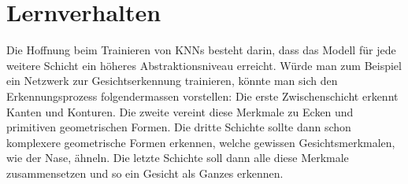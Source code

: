 \section{Lernverhalten}
Die Hoffnung beim Trainieren von KNNs besteht darin, dass das Modell für jede
weitere Schicht ein höheres Abstraktionsniveau erreicht. Würde man zum
Beispiel ein Netzwerk zur Gesichtserkennung trainieren, könnte man sich den
Erkennungsprozess folgendermassen vorstellen: Die erste Zwischenschicht erkennt
Kanten und Konturen. Die zweite vereint diese Merkmale zu Ecken und primitiven
geometrischen Formen. Die dritte Schichte sollte dann schon komplexere
geometrische Formen erkennen, welche gewissen Gesichtsmerkmalen, wie der Nase,
ähneln.
Die letzte Schichte soll dann alle diese
Merkmale zusammensetzen und so ein Gesicht als Ganzes erkennen.

